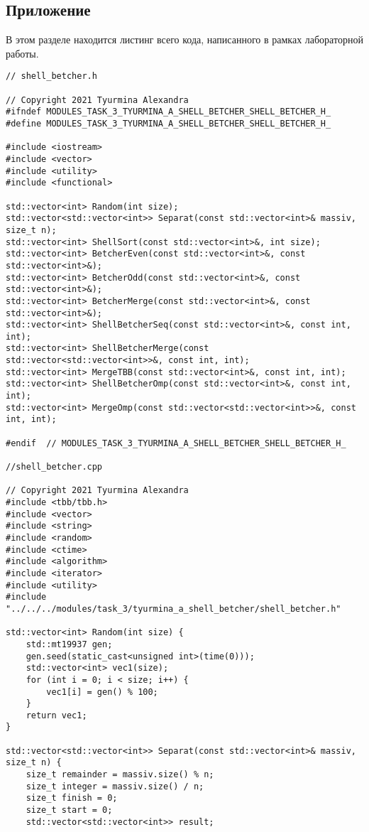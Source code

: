 \documentclass{report}
\begin{document}
\begin{center}
\section*{Приложение}
\end{center}
В этом разделе находится листинг всего кода, написанного в рамках лабораторной работы.
\begin{lstlisting}
// shell_betcher.h

// Copyright 2021 Tyurmina Alexandra
#ifndef MODULES_TASK_3_TYURMINA_A_SHELL_BETCHER_SHELL_BETCHER_H_
#define MODULES_TASK_3_TYURMINA_A_SHELL_BETCHER_SHELL_BETCHER_H_

#include <iostream>
#include <vector>
#include <utility>
#include <functional>

std::vector<int> Random(int size);
std::vector<std::vector<int>> Separat(const std::vector<int>& massiv, size_t n);
std::vector<int> ShellSort(const std::vector<int>&, int size);
std::vector<int> BetcherEven(const std::vector<int>&, const std::vector<int>&);
std::vector<int> BetcherOdd(const std::vector<int>&, const std::vector<int>&);
std::vector<int> BetcherMerge(const std::vector<int>&, const std::vector<int>&);
std::vector<int> ShellBetcherSeq(const std::vector<int>&, const int, int);
std::vector<int> ShellBetcherMerge(const std::vector<std::vector<int>>&, const int, int);
std::vector<int> MergeTBB(const std::vector<int>&, const int, int);
std::vector<int> ShellBetcherOmp(const std::vector<int>&, const int, int);
std::vector<int> MergeOmp(const std::vector<std::vector<int>>&, const int, int);

#endif  // MODULES_TASK_3_TYURMINA_A_SHELL_BETCHER_SHELL_BETCHER_H_

//shell_betcher.cpp

// Copyright 2021 Tyurmina Alexandra
#include <tbb/tbb.h>
#include <vector>
#include <string>
#include <random>
#include <ctime>
#include <algorithm>
#include <iterator>
#include <utility>
#include "../../../modules/task_3/tyurmina_a_shell_betcher/shell_betcher.h"

std::vector<int> Random(int size) {
    std::mt19937 gen;
    gen.seed(static_cast<unsigned int>(time(0)));
    std::vector<int> vec1(size);
    for (int i = 0; i < size; i++) {
        vec1[i] = gen() % 100;
    }
    return vec1;
}

std::vector<std::vector<int>> Separat(const std::vector<int>& massiv, size_t n) {
    size_t remainder = massiv.size() % n;
    size_t integer = massiv.size() / n;
    size_t finish = 0;
    size_t start = 0;
    std::vector<std::vector<int>> result;


\end{lstlisting}
\end{document}
